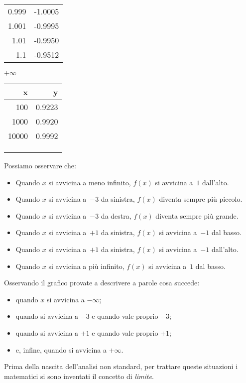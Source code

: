\begin{esempio}
\begin{minipage}{.24\textwidth}
\begin{center}
\begin{tabular}{r|r}
0.999 & -1.0005 \\
1.001 & -0.9995 \\
1.01 & -0.9950 \\
1.1 & -0.9512 \\
\end{tabular}
\end{center}
\end{minipage}
\begin{minipage}{.24\textwidth}
\begin{center}
\(+\infty\)\\
\begin{tabular}{r|r}
x & y\\\hline
100 & 0.9223 \\
1000 & 0.9920 \\
10000 & 0.9992 \\
&\\
&\\
&
\end{tabular}
\end{center}
\end{minipage}
Possiamo osservare che:
\begin{itemize} [nosep]
 \item 
Quando \(x\) si avvicina a meno infinito, \(f(x)\) si avvicina a~\(1\) dall'alto.
 \item 
Quando \(x\) si avvicina a~\(-3\) da sinistra, \(f(x)\) diventa sempre più 
piccolo.
 \item 
Quando \(x\) si avvicina a~\(-3\) da destra, \(f(x)\) diventa sempre più 
grande.
 \item 
Quando \(x\) si avvicina a~\(+1\) da sinistra, \(f(x)\)  si avvicina a~\(-1\) dal 
basso.
 \item 
Quando \(x\) si avvicina a~\(+1\) da sinistra, \(f(x)\)  si avvicina a~\(-1\) 
dall'alto.
 \item 
Quando \(x\) si avvicina a più infinito, \(f(x)\) si avvicina a~\(1\) dal basso.
\end{itemize}
\begin{center}\scalebox{.6}{\limitigraficoa}\end{center}
\end{esempio}

Osservando il grafico provate a descrivere a parole cosa succede: 
\begin{itemize} [nosep]
 \item quando \(x\) si avvicina a \(-\infty\); 
 \item quando si avvicina a \(-3\) e quando vale proprio \(-3\);
 \item quando si avvicina a \(+1\) e quando vale proprio \(+1\); 
 \item e, infine, quando si avvicina a \(+\infty\).
\end{itemize}
\vspace{1em}
Prima della nascita dell'analisi non standard, per trattare queste 
situazioni i matematici si sono inventati il concetto di 
\emph{limite}.

